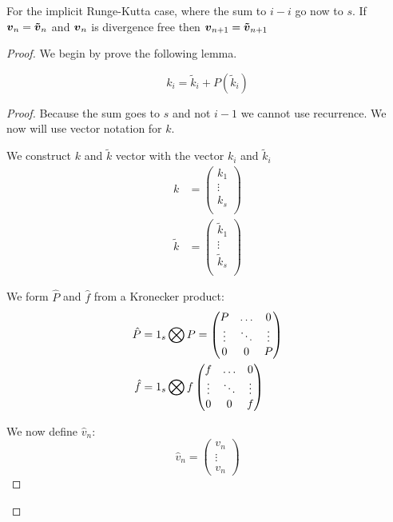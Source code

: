 \begin{thm}
 For the implicit Runge-Kutta case, where the sum to $i-i$ go now to $s$.
If ${\boldsymbol {v}}_{n}={\boldsymbol {\tilde{v}}}_{n}$ and ${\boldsymbol {v}}_n$ is divergence free then ${\boldsymbol {v}}_{n+1}={\boldsymbol {\tilde{v}}}_{n+1}$ 
\end{thm}
 \begin{proof}
 We begin by prove the following lemma.
 \begin{lem}
 \begin{equation}
  k_{i}=\tilde{k}_{i}+P(\tilde{k}_{i})
 \end{equation}
 \end{lem}
 \begin{proof}
Because the sum goes to $s$ and not $i-1$ we cannot use recurrence.
We now will use vector notation for $k$.

We construct $k$ and $\tilde{k}$ vector with the vector $k_{i}$ and $\tilde{k}_{i}$
\begin{align}
 k&=\begin{pmatrix}
    k_{1}\\
    \vdots\\
    k_{s}\\
   \end{pmatrix}\\
 \tilde{k}&=\begin{pmatrix}
    \tilde{k}_{1}\\
    \vdots\\
    \tilde{k}_{s}\\
   \end{pmatrix}
\end{align}

We form $\hat{P}$ and $\hat{f}$ from a Kronecker product:
\begin{align}
 \hat{P}&=1_{s}\bigotimes P=\begin{pmatrix}P	&\ldots	&0\\
			\vdots &\ddots 	&\vdots\\
			0	&0	&P\\
         \end{pmatrix}\\
 \hat{f}&=1_{s}\bigotimes f\begin{pmatrix}f	&\ldots	&0\\
			\vdots &\ddots 	&\vdots\\
			0	&0	&f\\
         \end{pmatrix}
\end{align}

We now define $\hat{v}_n$:
\begin{equation}
 \hat{v}_{n}=\begin{pmatrix}
               v_{n}\\
               \vdots\\
               v_{n}
              \end{pmatrix}
\end{equation}


\end{proof}
\end{proof}
